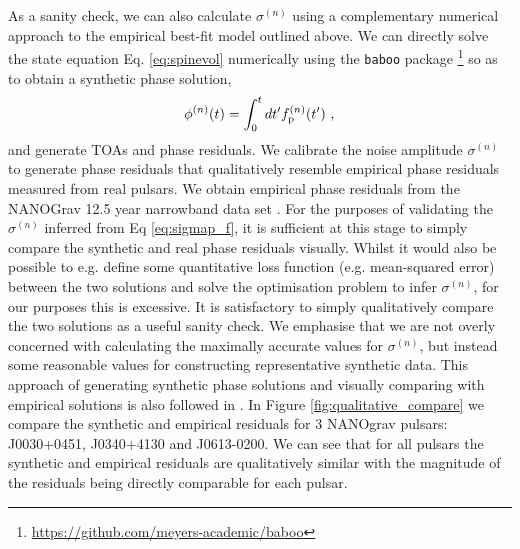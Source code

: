 \documentclass[fleqn,usenatbib,useAMS]{mnras}
\begin{document}
As a sanity check, we can also calculate $\sigma^{(n)}$ using a complementary numerical approach to the empirical best-fit model outlined above. We can directly solve the state equation Eq. \ref{eq:spinevol} numerically using the \texttt{baboo} package \footnote{\url{https://github.com/meyers-academic/baboo}} so as to obtain a synthetic phase solution,
\begin{eqnarray}
	\phi^{(n)}(t) = \int_0^t dt' f^{(n)}_{\rm p}(t') \ ,
\end{eqnarray}
and generate TOAs and phase residuals. We calibrate the noise amplitude $\sigma^{(n)}$  to generate phase residuals that qualitatively resemble empirical phase residuals measured from real pulsars. We obtain empirical phase residuals from the NANOGrav 12.5 year narrowband data set \cite{nanograv_narrowband_DR}. For the purposes of validating the $\sigma^{(n)}$ inferred from Eq \ref{eq:sigmap_f}, it is sufficient at this stage to simply compare the synthetic and real phase residuals visually. Whilst it would also be possible to e.g. define some quantitative loss function (e.g. mean-squared error) between the two solutions and solve the optimisation problem to infer $\sigma^{(n)}$, for our purposes this is excessive. It is satisfactory to simply qualitatively compare the two solutions as a useful sanity check. We emphasise that we are not overly concerned with calculating the maximally accurate values for $\sigma^{(n)}$, but instead some reasonable values for constructing representative synthetic data. This approach of generating synthetic phase solutions and visually comparing with empirical solutions is also followed in \cite{Vargas}. In Figure \ref{fig:qualitative_compare} we compare the synthetic and empirical residuals for 3 NANOgrav pulsars: J0030+0451, J0340+4130 and J0613-0200. We can see that for all pulsars the synthetic and empirical residuals are qualitatively similar with the magnitude of the residuals being directly comparable for each pulsar. 
%	
%	
%
%
\end{document}
